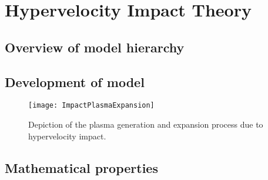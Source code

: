 
\chapter{Hypervelocity Impact Theory}
\label{ch.ImpactTheory}

\section{Overview of model hierarchy}

\section{Development of model}
\begin{figure}[hbt]
\begin{center}
\texttt{[image: ImpactPlasmaExpansion]}
\end{center}
\caption{\label{fig:ImpactPlasmaExpansion} Depiction of the plasma generation and expansion process due to hypervelocity impact.}
\end{figure}

\section{Mathematical properties}
